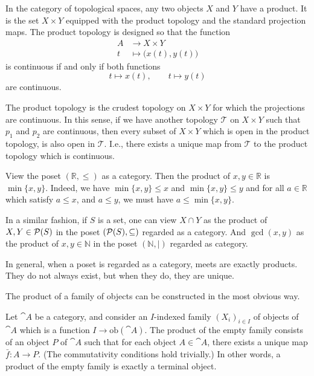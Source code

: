 \begin{example}
    In the category of topological spaces, any two objects $X$ and $Y$ have a product. It is the set $X\times Y$ equipped with the product topology and the standard projection maps. The product topology is designed so that the function
    \begin{align*}
        A &\to X\times Y\\
        t &\mapsto \big(x(t), y(t)\big)
    \end{align*}
    is continuous if and only if both functions
    \begin{equation*}
        t\mapsto x(t), \qquad t\mapsto y(t)
    \end{equation*}
    are continuous.\par

    The product topology is the crudest topology on $X\times Y$ for which the projections are continuous. In this sense, if we have another topology $\mathcal{T}$ on $X\times Y$ such that $p_1$ and $p_2$ are continuous, then every subset of $X\times Y$ which is open in the product topology, is also open in $\mathcal{T}$. I.e., there exists a unique map from $\mathcal{T}$ to the product topology which is continuous.
\end{example}

\begin{example}
    View the poset $(\mathbb{R}, \leq)$ as a category. Then the product of $x,y\in\mathbb{R}$ is $\min\{x,y\}$. Indeed, we have $\min\{x,y\}\leq x$ and $\min\{x,y\}\leq y$ and for all $a\in\mathbb{R}$ which satisfy $a\leq x$, and $a\leq y$, we must have $a\leq\min\{x,y\}$.
\end{example}

In a similar fashion, if $S$ is a set, one can view $X\cap Y$ as the product of $X,Y\in\mathcal{P}(S)$ in the poset $(\mathcal{P}(S), \subseteq)$ regarded as a category. And $\gcd(x,y)$ as the product of $x,y\in\mathbb{N}$ in the poset $(\mathbb{N}, \vert)$ regarded as category.\par

In general, when a poset is regarded as a category, meets are exactly products. They do not always exist, but when they do, they are unique.\par

The product of a family of objects can be constructed in the most obvious way.\par

Let $\cat{A}$ be a category, and consider an $I$-indexed family $(X_i)_{i\in I}$ of objects of $\cat{A}$ which is a function $I\to\text{ob}(\cat{A})$. The product of the empty family consists of an object $P$ of $\cat{A}$ such that for each object $A\in\cat{A}$, there exists a unique map $\bar{f}:A\to P$. (The commutativity conditions hold trivially.) In other words, a product of the empty family is exactly a terminal object.
